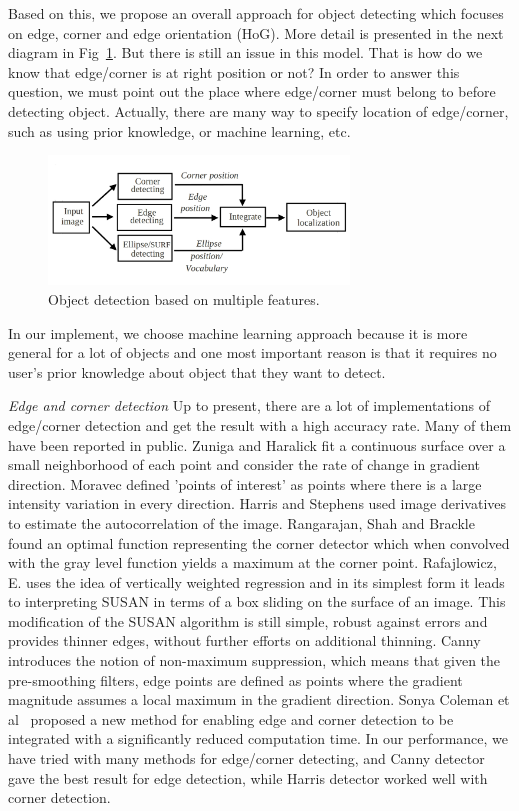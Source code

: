 Based on this, we propose an overall approach for object detecting
which focuses on edge, corner and edge orientation (HoG). More
detail is presented in the next diagram in Fig~\ref{fig:framework}. But there is still an
issue in this model. That is how do we know that edge/corner is at
right position or not? In order to answer this question, we must point
out the place where edge/corner must belong to before detecting
object. Actually, there are many way to specify location of
edge/corner, such as using prior knowledge, or machine learning, etc.
\begin{figure}[ht]
  \centering
  \includegraphics[width=3.15in]{images/framework1.jpg}
  \caption{Object detection based on multiple features.}
  \label{fig:framework}
\end{figure}
In our implement, we choose machine learning approach because
it is more general for a lot of objects and one most
important reason is that it requires no user's prior knowledge about object that they want to detect.

\textit{Edge and corner detection }
Up to present, there are a lot of implementations of edge/corner
detection and get the result with a high accuracy rate. Many of them
have been reported in public. Zuniga and Haralick fit a continuous
surface over a small neighborhood of each point and consider the
rate of change in gradient direction. Moravec defined 'points of interest' as points where there is a 
large intensity variation in every direction. Harris and Stephens used image derivatives to estimate the
autocorrelation of the image. Rangarajan, Shah and Brackle found an
optimal function representing the corner detector which when
convolved with the gray level function yields a maximum at the
corner point. Rafajlowicz, E. uses the idea of vertically weighted
regression and in its simplest form it leads to interpreting SUSAN in
terms of a box sliding on the surface of an image. This modification
of the SUSAN algorithm is still simple, robust against errors and
provides thinner edges, without further efforts on additional thinning.
Canny introduces the notion of non-maximum suppression, which
means that given the pre-smoothing filters, edge points are defined
as points where the gradient magnitude assumes a local maximum in
the gradient direction. Sonya Coleman et al~\cite{coleman2007integrated}
proposed a new method for enabling edge and corner detection to be
integrated with a significantly reduced computation time.
In our performance, we have tried with many methods for
edge/corner detecting, and Canny detector gave the
best result for edge detection, while Harris detector worked well with
corner detection.

